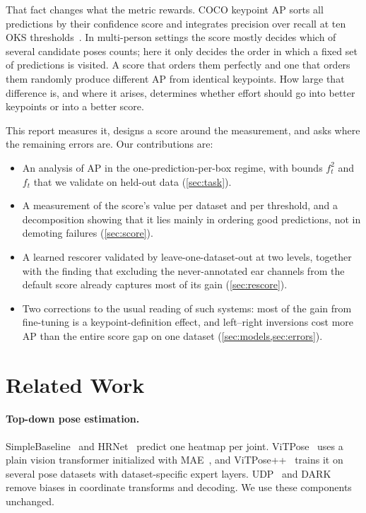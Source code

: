 \documentclass[10pt,twocolumn,letterpaper]{article}
\begin{document}
That fact changes what the metric rewards. COCO keypoint AP sorts all predictions by their confidence score and integrates precision over recall at ten OKS thresholds~\cite{coco}. In multi-person settings the score mostly decides which of several candidate poses counts; here it only decides the order in which a fixed set of predictions is visited. A score that orders them perfectly and one that orders them randomly produce different AP from identical keypoints. How large that difference is, and where it arises, determines whether effort should go into better keypoints or into a better score.

This report measures it, designs a score around the measurement, and asks where the remaining errors are. Our contributions are:
\begin{itemize}
\item An analysis of AP in the one-prediction-per-box regime, with bounds $f_t^2$ and $f_t$ that we validate on held-out data (\cref{sec:task}).
\item A measurement of the score's value per dataset and per threshold, and a decomposition showing that it lies mainly in ordering good predictions, not in demoting failures (\cref{sec:score}).
\item A learned rescorer validated by leave-one-dataset-out at two levels, together with the finding that excluding the never-annotated ear channels from the default score already captures most of its gain (\cref{sec:rescore}).
\item Two corrections to the usual reading of such systems: most of the gain from fine-tuning is a keypoint-definition effect, and left--right inversions cost more AP than the entire score gap on one dataset (\cref{sec:models,sec:errors}).
\end{itemize}

\section{Related Work}

\paragraph{Top-down pose estimation.} SimpleBaseline~\cite{simplebaseline} and HRNet~\cite{hrnet} predict one heatmap per joint. ViTPose~\cite{vitpose} uses a plain vision transformer initialized with MAE~\cite{mae}, and ViTPose++~\cite{vitposepp} trains it on several pose datasets with dataset-specific expert layers. UDP~\cite{udp} and DARK~\cite{dark} remove biases in coordinate transforms and decoding. We use these components unchanged.
\end{document}
